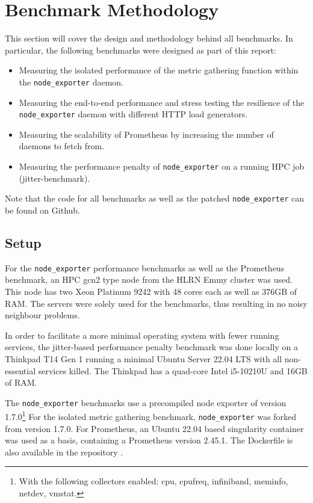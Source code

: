 \section{Benchmark Methodology}
This section will cover the design and methodology behind all benchmarks. In particular, the following
benchmarks were designed as part of this report:

\begin{itemize}
  \item Measuring the isolated performance of the metric gathering function within the \texttt{node\_exporter} daemon.
  \item Measuring the end-to-end performance and stress testing the resilience of the \texttt{node\_exporter} daemon with different HTTP load generators.
  \item Measuring the scalability of Prometheus by increasing the number of daemons to fetch from.
  \item Measuring the performance penalty of \texttt{node\_exporter} on a running \ac{HPC} job (jitter-benchmark).
\end{itemize}

Note that the code for all benchmarks \cite{my_repo} as well as the patched \texttt{node\_exporter} \cite{my_node_exporter}
can be found on Github.

\subsection{Setup}

For the \texttt{node\_exporter} performance benchmarks as well as the Prometheus benchmark, an \ac{HPC} 
gcn2 type node from the HLRN Emmy cluster was used. This node has two Xeon Platinum 9242 with 48 cores each
as well as 376GB of RAM. The servers were solely used for the benchmarks, thus resulting in
no noisy neighbour problems.

In order to facilitate a more minimal operating system with fewer running services, the jitter-based 
performance penalty benchmark was done locally on a Thinkpad T14 Gen 1 running a minimal
Ubuntu Server 22.04 LTS with all non-essential services killed. The Thinkpad has a quad-core Intel i5-10210U and 16GB of RAM.

The \texttt{node\_exporter} benchmarks use a precompiled node exporter of version 1.7.0\footnote{With the following collectors enabled: cpu, cpufreq, infiniband, meminfo, netdev, vmstat.}
For the isolated metric gathering benchmark, 
\texttt{node\_exporter} was forked from version 1.7.0. For Prometheus, an Ubuntu 22.04 based singularity
container was used as a basis, containing a Prometheus version 2.45.1. The Dockerfile is also available
in the repository \cite{my_repo}.

